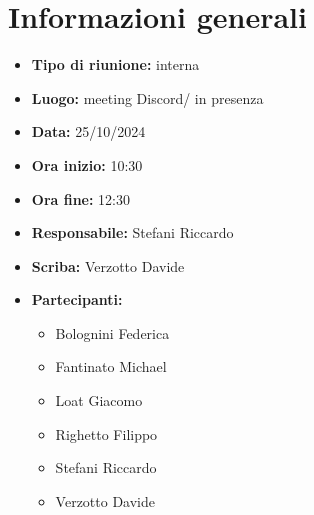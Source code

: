 \section{Informazioni generali}

\begin{itemize}
    \item \textbf{Tipo di riunione:} interna
    \item \textbf{Luogo:} meeting Discord/ in presenza
    \item \textbf{Data:} 25/10/2024
    \item \textbf{Ora inizio:} 10:30
    \item \textbf{Ora fine:} 12:30
    \item \textbf{Responsabile:} Stefani Riccardo
    \item \textbf{Scriba:} Verzotto Davide
    \item \textbf{Partecipanti:}
    \begin{itemize}
        \renewcommand{\labelitemii}{--}
        \item Bolognini Federica
        \item Fantinato Michael
        \item Loat Giacomo
        \item Righetto Filippo
        \item Stefani Riccardo
        \item Verzotto Davide
    \end{itemize}
\end{itemize}
